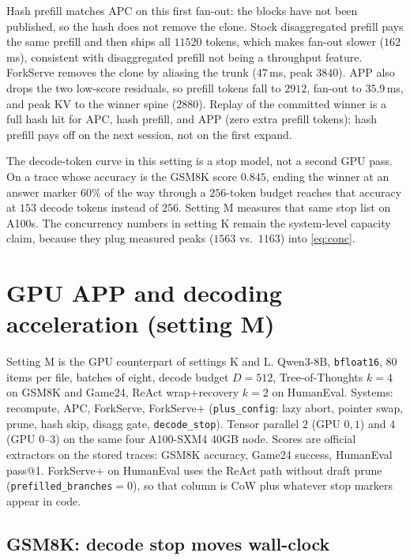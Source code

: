 \documentclass[11pt,a4paper]{article}
\begin{document}
Hash prefill matches APC on this first fan-out: the blocks have not been published, so the hash does not remove the clone.
Stock disaggregated prefill pays the same prefill and then ships all $11520$ tokens, which makes fan-out slower ($162$\,ms), consistent with disaggregated prefill not being a throughput feature.
ForkServe removes the clone by aliasing the trunk ($47$\,ms, peak $3840$).
APP also drops the two low-score residuals, so prefill tokens fall to $2912$, fan-out to $35.9$\,ms, and peak KV to the winner spine ($2880$).
Replay of the committed winner is a full hash hit for APC, hash prefill, and APP (zero extra prefill tokens): hash prefill pays off on the next session, not on the first expand.

The decode-token curve in this setting is a stop model, not a second GPU pass.
On a trace whose accuracy is the GSM8K score $0.845$, ending the winner at an answer marker $60\%$ of the way through a $256$-token budget reaches that accuracy at $153$ decode tokens instead of $256$.
Setting M measures that same stop list on A100s.
The concurrency numbers in setting K remain the system-level capacity claim, because they plug measured peaks ($1563$ vs.\ $1163$) into \eqref{eq:conc}.

\section{GPU APP and decoding acceleration (setting M)}

Setting M is the GPU counterpart of settings K and L.
Qwen3-8B, \texttt{bfloat16}, $80$ items per file, batches of eight, decode budget $D{=}512$, Tree-of-Thoughts $k{=}4$ on GSM8K and Game24, ReAct wrap+recovery $k{=}2$ on HumanEval.
Systems: recompute, APC, ForkServe, ForkServe+ (\texttt{plus\_config}: lazy abort, pointer swap, prune, hash skip, disagg gate, \texttt{decode\_stop}).
Tensor parallel $2$ (GPU $0,1$) and $4$ (GPU $0$--$3$) on the same four A100-SXM4 40GB node.
Scores are official extractors on the stored traces: GSM8K accuracy, Game24 success, HumanEval pass@1.
ForkServe+ on HumanEval uses the ReAct path without draft prune (\texttt{prefilled\_branches}${=}0$), so that column is CoW plus whatever stop markers appear in code.

\subsection{GSM8K: decode stop moves wall-clock}
\end{document}
